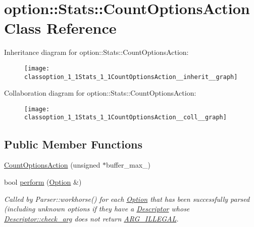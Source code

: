 \hypertarget{classoption_1_1Stats_1_1CountOptionsAction}{}\section{option\+:\+:Stats\+:\+:Count\+Options\+Action Class Reference}
\label{classoption_1_1Stats_1_1CountOptionsAction}


Inheritance diagram for option\+:\+:Stats\+:\+:Count\+Options\+Action\+:\nopagebreak
\begin{figure}[H]
\begin{center}
\leavevmode
\texttt{[image: classoption\_1\_1Stats\_1\_1CountOptionsAction\_\_inherit\_\_graph]}
\end{center}
\end{figure}


Collaboration diagram for option\+:\+:Stats\+:\+:Count\+Options\+Action\+:\nopagebreak
\begin{figure}[H]
\begin{center}
\leavevmode
\texttt{[image: classoption\_1\_1Stats\_1\_1CountOptionsAction\_\_coll\_\_graph]}
\end{center}
\end{figure}
\subsection*{Public Member Functions}
\begin{DoxyCompactItemize}
\item 
\hyperlink{classoption_1_1Stats_1_1CountOptionsAction_a24a38b87ad129b0e12660bd2019ba284}{Count\+Options\+Action} (unsigned $\ast$buffer\+\_\+max\+\_\+)
\item 
bool \hyperlink{classoption_1_1Stats_1_1CountOptionsAction_a29ab8a68d0a30736b99b4d2e5dece489}{perform} (\hyperlink{classoption_1_1Option}{Option} \&)
\begin{DoxyCompactList}\small\item\em Called by Parser\+::workhorse() for each \hyperlink{classoption_1_1Option}{Option} that has been successfully parsed (including unknown options if they have a \hyperlink{structoption_1_1Descriptor}{Descriptor} whose \hyperlink{structoption_1_1Descriptor_aa5d675dba0214a4abd73007ff163cc67}{Descriptor\+::check\+\_\+arg} does not return \hyperlink{namespaceoption_aee8c76a07877335762631491e7a5a1a9a9528e32563b795bd2930b12d0a5e382d}{A\+R\+G\+\_\+\+I\+L\+L\+E\+G\+AL}. \end{DoxyCompactList}\end{DoxyCompactItemize}


